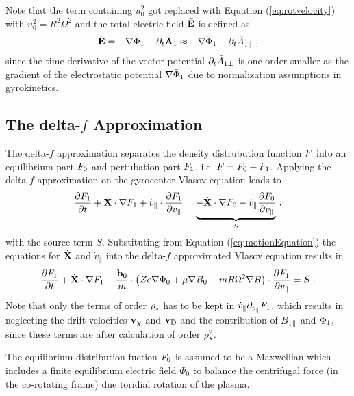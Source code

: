 Note that the term containing $u_0^2$ got replaced with Equation (\ref{eq:rotvelocity}) with $u_0^2 = R^2 \Omega^2$ and the total electric field $\bar{\boldsymbol{\mathbf{E}}}$ is defined as 
\begin{gather}
	\bar{\boldsymbol{\mathbf{E}}} = - \nabla \bar{\Phi}_1 - \partial_t \bar{\boldsymbol{\mathbf{A}}}_1 \approx - \nabla \bar{\Phi}_1 - \partial_t \bar{A}_{1\parallel} ~,
	\label{eq:totalElectricField}
\end{gather}
since the time derivative of the vector potential $\partial_t \bar{A}_{1\perp}$ is one order smaller as the gradient of the electrostatic potential $\nabla \bar{\Phi}_1$ due to normalization assumptions in gyrokinetics\cite{Peeters2009A}.




\newpage

\subsection{The delta-\!$f$ Approximation}
\label{sub:approximation}

The delta-\!$f$ approximation separates the density distrubution function $F$ into an equilibrium part $F_0$ and pertubation part $F_1$, i.e. $F = F_0 + F_1$. Applying the delta-\!$f$ approximation on the gyrocenter Vlasov equation leads to
\begin{gather}
	\frac{\partial F_1}{\partial t} + \dot{\boldsymbol{\mathbf{X}}} \cdot \nabla F_1 + \dot{v}_\parallel \cdot \frac{\partial F_1}{\partial v_\parallel} = \underbrace{- \dot{\boldsymbol{\mathbf{X}}} \cdot \nabla F_0 - \dot{v}_\parallel \frac{\partial F_0}{\partial v_\parallel}}_S~,
	\label{eq:gyrocenterDeltafVlasov}
\end{gather}
with the source term $S$. Substituting from Equation (\ref{eq:motionEquation}) the equations for $\dot{\boldsymbol{\mathbf{X}}}$ and $\dot{v}_\parallel$ into the delta-$f$ approximated Vlasov equation results in
\begin{gather}
	\frac{\partial F_1}{\partial t} + \dot{\boldsymbol{\mathbf{X}}} \cdot \nabla F_1 - \frac{\boldsymbol{\mathbf{b}}_0}{m} \cdot \left(Ze\nabla \Phi_0 + \mu \nabla B_0 - mR \Omega^2 \nabla R \right) \cdot \frac{\partial F_1}{\partial v_\parallel} = S~.
	\label{eq:gyrocenterDeltafSubVlasov}
\end{gather}
Note that only the terms of order $\rho_\star$ has to be kept in $\dot{v}_\parallel \partial_{v_\parallel} F_1$, which results in neglecting the drift velocities $\boldsymbol{\mathbf{v}}_\chi$ and $\boldsymbol{\mathbf{v}}_\mathrm{D}$ and the contribution of $\bar{B}_{1\parallel}$ and $\bar{\Phi}_1$, since these terms are after calculation of order $\rho_\star^2$. \bigskip

The equilibrium distribution fuction $F_0$ is assumed to be a Maxwellian which includes a finite equilibrium electric field $\Phi_0$ to balance the centrifugal force (in the co-rotating frame) due toridial rotation of the plasma. 

